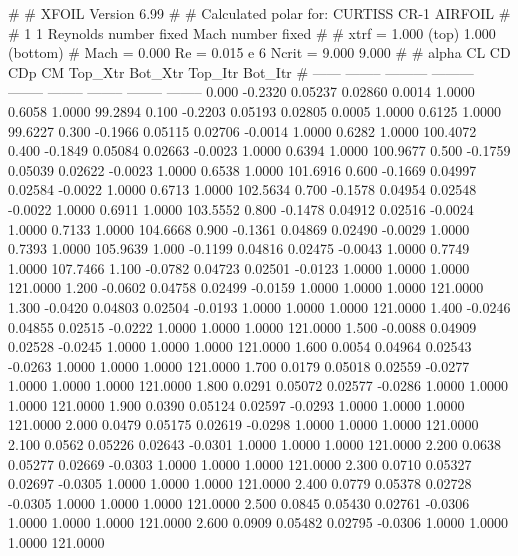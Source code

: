 #  
#       XFOIL         Version 6.99
#  
# Calculated polar for: CURTISS CR-1 AIRFOIL                            
#  
# 1 1 Reynolds number fixed          Mach number fixed         
#  
# xtrf =   1.000 (top)        1.000 (bottom)  
# Mach =   0.000     Re =     0.015 e 6     Ncrit =   9.000  9.000
#  
#   alpha    CL        CD       CDp       CM     Top_Xtr  Bot_Xtr  Top_Itr  Bot_Itr
#  ------ -------- --------- --------- -------- -------- -------- -------- --------
   0.000  -0.2320   0.05237   0.02860   0.0014   1.0000   0.6058   1.0000  99.2894
   0.100  -0.2203   0.05193   0.02805   0.0005   1.0000   0.6125   1.0000  99.6227
   0.300  -0.1966   0.05115   0.02706  -0.0014   1.0000   0.6282   1.0000 100.4072
   0.400  -0.1849   0.05084   0.02663  -0.0023   1.0000   0.6394   1.0000 100.9677
   0.500  -0.1759   0.05039   0.02622  -0.0023   1.0000   0.6538   1.0000 101.6916
   0.600  -0.1669   0.04997   0.02584  -0.0022   1.0000   0.6713   1.0000 102.5634
   0.700  -0.1578   0.04954   0.02548  -0.0022   1.0000   0.6911   1.0000 103.5552
   0.800  -0.1478   0.04912   0.02516  -0.0024   1.0000   0.7133   1.0000 104.6668
   0.900  -0.1361   0.04869   0.02490  -0.0029   1.0000   0.7393   1.0000 105.9639
   1.000  -0.1199   0.04816   0.02475  -0.0043   1.0000   0.7749   1.0000 107.7466
   1.100  -0.0782   0.04723   0.02501  -0.0123   1.0000   1.0000   1.0000 121.0000
   1.200  -0.0602   0.04758   0.02499  -0.0159   1.0000   1.0000   1.0000 121.0000
   1.300  -0.0420   0.04803   0.02504  -0.0193   1.0000   1.0000   1.0000 121.0000
   1.400  -0.0246   0.04855   0.02515  -0.0222   1.0000   1.0000   1.0000 121.0000
   1.500  -0.0088   0.04909   0.02528  -0.0245   1.0000   1.0000   1.0000 121.0000
   1.600   0.0054   0.04964   0.02543  -0.0263   1.0000   1.0000   1.0000 121.0000
   1.700   0.0179   0.05018   0.02559  -0.0277   1.0000   1.0000   1.0000 121.0000
   1.800   0.0291   0.05072   0.02577  -0.0286   1.0000   1.0000   1.0000 121.0000
   1.900   0.0390   0.05124   0.02597  -0.0293   1.0000   1.0000   1.0000 121.0000
   2.000   0.0479   0.05175   0.02619  -0.0298   1.0000   1.0000   1.0000 121.0000
   2.100   0.0562   0.05226   0.02643  -0.0301   1.0000   1.0000   1.0000 121.0000
   2.200   0.0638   0.05277   0.02669  -0.0303   1.0000   1.0000   1.0000 121.0000
   2.300   0.0710   0.05327   0.02697  -0.0305   1.0000   1.0000   1.0000 121.0000
   2.400   0.0779   0.05378   0.02728  -0.0305   1.0000   1.0000   1.0000 121.0000
   2.500   0.0845   0.05430   0.02761  -0.0306   1.0000   1.0000   1.0000 121.0000
   2.600   0.0909   0.05482   0.02795  -0.0306   1.0000   1.0000   1.0000 121.0000
